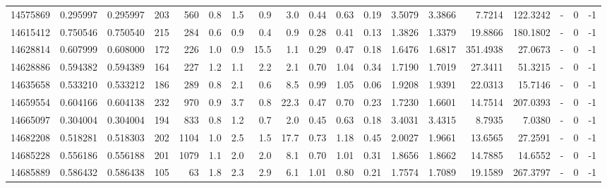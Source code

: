 \begin{tabular}{rrrrrrrrrrrrrrrrlrr}
  14575869 & 0.295997 &   0.295997 &  203 &  560 &      0.8 &      1.5 &     0.9 &      3.0 &       0.44 &        0.63 &        0.19 &  3.5079 &  3.3866 &    7.7214 &  122.3242 &             - &        0 &         -1 \\
  14615412 & 0.750546 &   0.750540 &  215 &  284 &      0.6 &      0.9 &     0.4 &      0.9 &       0.28 &        0.41 &        0.13 &  1.3826 &  1.3379 &   19.8866 &  180.1802 &             - &        0 &         -1 \\
  14628814 & 0.607999 &   0.608000 &  172 &  226 &      1.0 &      0.9 &    15.5 &      1.1 &       0.29 &        0.47 &        0.18 &  1.6476 &  1.6817 &  351.4938 &   27.0673 &             - &        0 &         -1 \\
  14628886 & 0.594382 &   0.594389 &  164 &  227 &      1.2 &      1.1 &     2.2 &      2.1 &       0.70 &        1.04 &        0.34 &  1.7190 &  1.7019 &   27.3411 &   51.3215 &             - &        0 &         -1 \\
  14635658 & 0.533210 &   0.533212 &  186 &  289 &      0.8 &      2.1 &     0.6 &      8.5 &       0.99 &        1.05 &        0.06 &  1.9208 &  1.9391 &   22.0313 &   15.7146 &             - &        0 &         -1 \\
  14659554 & 0.604166 &   0.604138 &  232 &  970 &      0.9 &      3.7 &     0.8 &     22.3 &       0.47 &        0.70 &        0.23 &  1.7230 &  1.6601 &   14.7514 &  207.0393 &             - &        0 &         -1 \\
  14665097 & 0.304004 &   0.304004 &  194 &  833 &      0.8 &      1.2 &     0.7 &      2.0 &       0.45 &        0.63 &        0.18 &  3.4031 &  3.4315 &    8.7935 &    7.0380 &             - &        0 &         -1 \\
  14682208 & 0.518281 &   0.518303 &  202 & 1104 &      1.0 &      2.5 &     1.5 &     17.7 &       0.73 &        1.18 &        0.45 &  2.0027 &  1.9661 &   13.6565 &   27.2591 &             - &        0 &         -1 \\
  14685228 & 0.556186 &   0.556188 &  201 & 1079 &      1.1 &      2.0 &     2.0 &      8.1 &       0.70 &        1.01 &        0.31 &  1.8656 &  1.8662 &   14.7885 &   14.6552 &             - &        0 &         -1 \\
  14685889 & 0.586432 &   0.586438 &  105 &   63 &      1.8 &      2.3 &     2.9 &      6.1 &       1.01 &        0.80 &        0.21 &  1.7574 &  1.7089 &   19.1589 &  267.3797 &             - &        0 &         -1 \\

\end{tabular}
